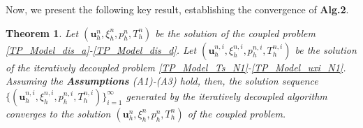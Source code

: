 \documentclass{article}
\newtheorem{theorem}{Theorem}[section]
\numberwithin{equation}{section}
\begin{document}
Now, we present the following key result, establishing the convergence of {\bf Alg.2}.

\begin{theorem}\label{convergence_of_N1}
Let $(\bm u_h^n,\xi_h^n,p_h^n,T_h^n)$ be the solution of the coupled problem \eqref{TP_Model_dis_a}-\eqref{TP_Model_dis_d}. 
Let $(\bm u_h^{n,i},\xi_h^{n,i},p_h^{n,i},T_h^{n,i})$ be the solution of the iteratively decoupled problem \eqref{TP_Model_Ts_N1}-\eqref{TP_Model_uxi_N1}. 
Assuming the \textbf{Assumptions} (A1)-(A3) hold, then, 
the solution sequence $\{(\bm u_h^{n,i},\xi_h^{n,i},p_h^{n,i},T_h^{n,i})\}_{i=1}^{\infty}$ generated by the iteratively decoupled algorithm converges to the solution $(\bm u_h^n,\xi_h^n,p_h^n,T_h^n)$ of the coupled problem. 
\end{theorem}
\end{document}
